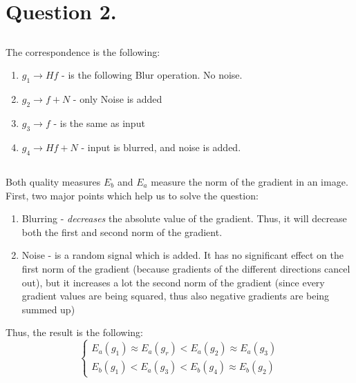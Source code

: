 \documentclass[a4paper]{iacas}
\begin{document}
\newpage
\section{Question 2.}
\subsection{}
The correspondence is the following:
\begin{enumerate}
\item $g_{1} \rightarrow Hf$ - is the following Blur operation. No noise.
\item $g_{2} \rightarrow f + N$ - only Noise is added
\item $g_{3} \rightarrow f$ - is the same as input
\item $g_{4} \rightarrow Hf + N$ - input is blurred, and noise is added.
\end{enumerate}


\subsection{}
Both quality measures $E_b$ and $E_a$ measure the norm of the gradient in an image. First, two major points which help us to solve the question:
\begin{enumerate}
\item Blurring - \textit{decreases} the absolute value of the gradient. Thus, it will decrease both the first and second norm of the gradient.
\item Noise - is a random signal which is added. It has no significant effect on the first norm of the gradient (because gradients of the different directions cancel out), but it increases a lot the second norm of the gradient (since every gradient values are being squared, thus also negative gradients are being summed up)
\end{enumerate}

Thus, the result is the following:
\begin{equation*}
\begin{cases}
E_{a}(g_{1}) \approx E_{a}(g_{r}) < E_{a}(g_{2}) \approx E_{a}(g_{3})  \\
E_{b}(g_{1}) < E_{a}(g_{3}) < E_{b}(g_{4}) \approx E_{b}(g_{2}) 
\end{cases}
\end{equation*}







\newpage
\end{document}
